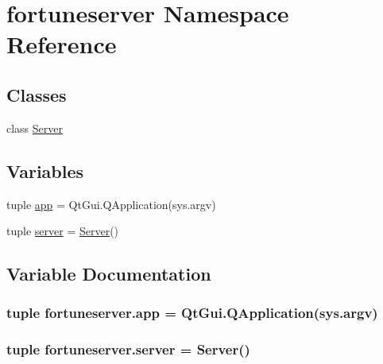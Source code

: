 \hypertarget{namespacefortuneserver}{}\section{fortuneserver Namespace Reference}
\label{namespacefortuneserver}
\subsection*{Classes}
\begin{DoxyCompactItemize}
\item 
class \hyperlink{classfortuneserver_1_1Server}{Server}
\end{DoxyCompactItemize}
\subsection*{Variables}
\begin{DoxyCompactItemize}
\item 
tuple \hyperlink{namespacefortuneserver_a21c9b244bb93f4667623769a8508e1a3}{app} = Qt\+Gui.\+Q\+Application(sys.\+argv)
\item 
tuple \hyperlink{namespacefortuneserver_a739df983c8dab895d6e3de2989668472}{server} = \hyperlink{classfortuneserver_1_1Server}{Server}()
\end{DoxyCompactItemize}


\subsection{Variable Documentation}
\hypertarget{namespacefortuneserver_a21c9b244bb93f4667623769a8508e1a3}{}
\subsubsection[{app}]{\setlength{\rightskip}{0pt plus 5cm}tuple fortuneserver.\+app = Qt\+Gui.\+Q\+Application(sys.\+argv)}\label{namespacefortuneserver_a21c9b244bb93f4667623769a8508e1a3}
\hypertarget{namespacefortuneserver_a739df983c8dab895d6e3de2989668472}{}
\subsubsection[{server}]{\setlength{\rightskip}{0pt plus 5cm}tuple fortuneserver.\+server = {\bf Server}()}\label{namespacefortuneserver_a739df983c8dab895d6e3de2989668472}
